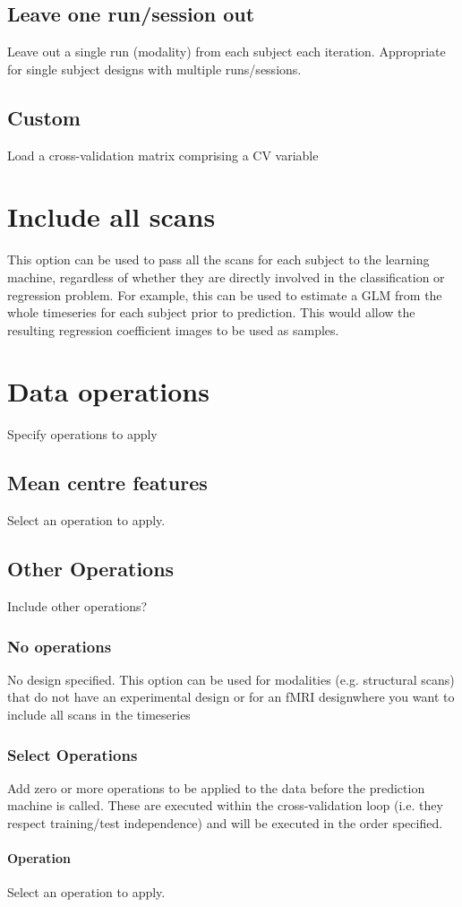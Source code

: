 \subsection{Leave one run/session out}
Leave out a single run (modality) from each subject each iteration. Appropriate for single subject designs with multiple runs/sessions.


\subsection{Custom}
Load a cross-validation matrix comprising a CV variable


\section{Include all scans}
This option can be used to pass all the scans for each subject to the learning machine, regardless of whether they are directly involved in the classification or regression problem. For example, this can be used to estimate a GLM from the whole timeseries for each subject prior to prediction. This would allow the resulting regression coefficient images to be used as samples.


\section{Data operations}
Specify operations to apply


\subsection{Mean centre features}
Select an operation to apply.


\subsection{Other Operations}
Include other operations?


\subsubsection{No operations}
No design specified. This option can be used for modalities (e.g. structural scans) that do not have an experimental design or for an fMRI designwhere you want to include all scans in the timeseries


\subsubsection{Select Operations}
Add zero or more operations to be applied to the data before the prediction machine is called. These are executed within the cross-validation loop (i.e. they respect training/test independence) and will be executed in the order specified. 


\paragraph{Operation}
Select an operation to apply.

